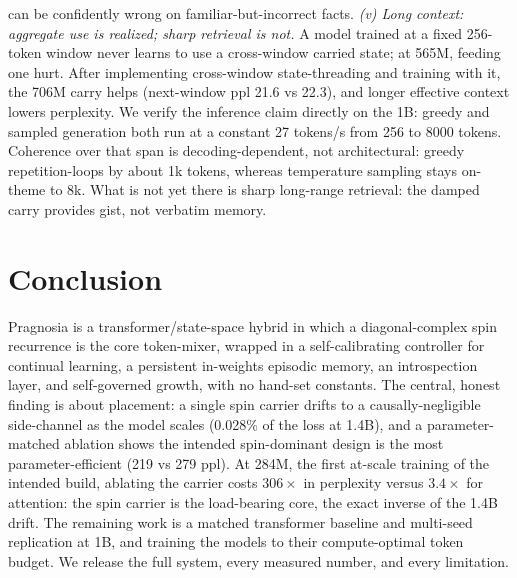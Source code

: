 \documentclass[journal]{IEEEtran}
\begin{document}
can be confidently wrong on familiar-but-incorrect facts. \emph{(v) Long context: aggregate use is realized; sharp retrieval is not.} A model trained at a fixed 256-token window never learns to use a cross-window carried state; at 565M, feeding one hurt. After implementing cross-window state-threading and training with it, the 706M carry helps (next-window ppl 21.6 vs 22.3), and longer effective context lowers perplexity. We verify the inference claim directly on the 1B: greedy and sampled generation both run at a constant 27 tokens/s from 256 to 8000 tokens. Coherence over that span is decoding-dependent, not architectural: greedy repetition-loops by about 1k tokens, whereas temperature sampling stays on-theme to 8k. What is not yet there is sharp long-range retrieval: the damped carry provides gist, not verbatim memory.

\section{Conclusion}
Pragnosia is a transformer/state-space hybrid in which a diagonal-complex spin recurrence is the core token-mixer, wrapped in a self-calibrating controller for continual learning, a persistent in-weights episodic memory, an introspection layer, and self-governed growth, with no hand-set constants. The central, honest finding is about placement: a single spin carrier drifts to a causally-negligible side-channel as the model scales (0.028\% of the loss at 1.4B), and a parameter-matched ablation shows the intended spin-dominant design is the most parameter-efficient (219 vs 279 ppl). At 284M, the first at-scale training of the intended build, ablating the carrier costs $306\times$ in perplexity versus $3.4\times$ for attention: the spin carrier is the load-bearing core, the exact inverse of the 1.4B drift. The remaining work is a matched transformer baseline and multi-seed replication at 1B, and training the models to their compute-optimal token budget. We release the full system, every measured number, and every limitation.



\end{document}
